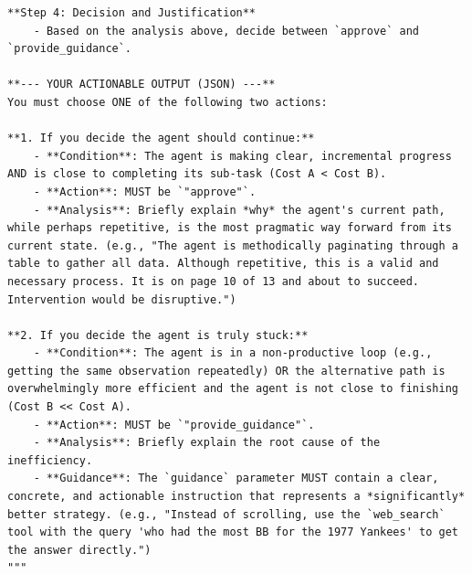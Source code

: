 \begin{tcolorbox}[
        colback=gray!5!white,
        colframe=gray!50!black,
        title=Prompt for "inefficiency\_behavior",
        floatplacement=Hp,
        breakable  %
    ]
\begin{lstlisting}[basicstyle=\ttfamily\small, breaklines=true, columns=fixed, breakindent=0pt, xleftmargin=0pt, gobble=0]
**Step 4: Decision and Justification**
    - Based on the analysis above, decide between `approve` and `provide_guidance`.
    
**--- YOUR ACTIONABLE OUTPUT (JSON) ---**
You must choose ONE of the following two actions:

**1. If you decide the agent should continue:**
    - **Condition**: The agent is making clear, incremental progress AND is close to completing its sub-task (Cost A < Cost B).
    - **Action**: MUST be `"approve"`.
    - **Analysis**: Briefly explain *why* the agent's current path, while perhaps repetitive, is the most pragmatic way forward from its current state. (e.g., "The agent is methodically paginating through a table to gather all data. Although repetitive, this is a valid and necessary process. It is on page 10 of 13 and about to succeed. Intervention would be disruptive.")

**2. If you decide the agent is truly stuck:**
    - **Condition**: The agent is in a non-productive loop (e.g., getting the same observation repeatedly) OR the alternative path is overwhelmingly more efficient and the agent is not close to finishing (Cost B << Cost A).
    - **Action**: MUST be `"provide_guidance"`.
    - **Analysis**: Briefly explain the root cause of the inefficiency.
    - **Guidance**: The `guidance` parameter MUST contain a clear, concrete, and actionable instruction that represents a *significantly* better strategy. (e.g., "Instead of scrolling, use the `web_search` tool with the query 'who had the most BB for the 1977 Yankees' to get the answer directly.")
"""
\end{lstlisting}
\end{tcolorbox}

